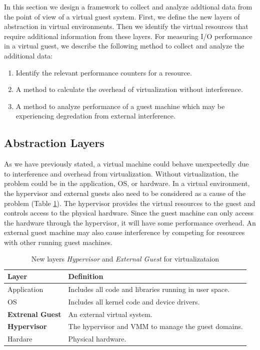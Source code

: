 In this section we design a framework to collect and analyze addtional data from the point of view of a virtual guest system. 
First, we define the new layers of abstraction in virtual environments.  
Then we identify the virtual resources that require additional information from these layers.
For measuring I/O performance in a virtual guest, we describe the following method to collect and analyze the additional data:
\begin {enumerate}
  \item Identify the relevant performance counters for a resource.
  \item A method to calculate the overhead of virtualization without interference.
  \item A method to analyze performance of a guest machine which may be experiencing degredation from external interference.
\end{enumerate}

\subsection{Abstraction Layers}
As we have previously stated, a virtual machine could behave unexpectedly due to interference and overhead from virtualization.
Without virtualization, the problem could be in the application, OS, or hardware.  
In a virtual environment, the hypervisor and external guests also need to be considered as a cause of the problem (Table \ref{tab:layers}).  
The hypervisor provides the virtual resources to the guest and controls access to the physical hardware.  
Since the guest machine can only access the hardware through the hypervisor, it will have some performance overhead. 
An external guest machine may also cause interference by competing for resources with other running guest machines.  

\begin{table}[h]
\begin{tabular}{ l p{10cm} }
  Layer & Definition \\
  \hline
  Application & Includes all code and libraries running in user space. \\
  OS & Includes all kernel code and device drivers. \\
  \textbf{Extrenal Guest} & An external virtual system. \\
  \textbf{Hypervisor} & The hypervisor and VMM to manage the guest domains. \\
  Hardare & Physical hardware. \\
  \hline
\end{tabular}
\caption{New layers \emph{Hypervisor} and \emph{External Guest} for virtualizataion}
\label{tab:layers}
\end{table}


